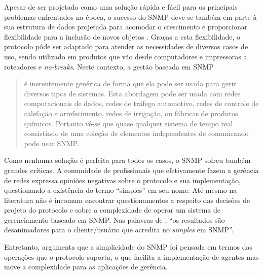 \documentclass[twoside,english,brazilian]{UNISINOSmonografia}
\begin{document}
Apesar de ser projetado como uma solução rápida e fácil para os principais 
problemas enfrentados na época, o sucesso do SNMP deve-se também em parte à 
sua estrutura de dados projetada para acomodar o crescimento e proporcionar 
flexibilidade para a inclusão de novos objetos \cite{stallings1999snmp}.
Graças a esta flexibilidade, o protocolo pôde ser adaptado para atender as 
necessidades de diversos casos de uso, sendo utilizado em produtos que vão 
desde computadores e impressoras a roteadores e \textit{no-breaks}.
Neste contexto, a gestão baseada em SNMP

\begin{quote}
é inerentemente genérica de forma que ela pode ser usada para gerir diversos 
tipos de sistemas. Esta abordagem pode ser usada com redes computacionais de 
dados, redes de tráfego automotivo, redes de controle de calefação e 
arrefecimento, redes de irrigação, ou fábricas de produtos químicos. Portanto 
vê-se que quase qualquer sistema de tempo real consistindo de uma coleção de 
elementos independentes de comunicando pode usar SNMP.
\cite[p.~2]{perkins1997understanding}
\end{quote}

Como nenhuma solução é perfeita para todos os casos, o SNMP sofreu também 
grandes críticas. 
A comunidade de profissionais que efetivamente fazem a gerência de redes 
expressa opiniões negativas sobre o protocolo e sua implementação, 
questionando a existência do termo ``simples'' em seu nome.
Até mesmo na literatura não é incomum encontrar questionamentos a respeito das 
decisões de projeto do protocolo e sobre a complexidade de operar um sistema 
de gerenciamento baseado em SNMP.
Nas palavras de , ``os resultados são 
desanimadores para o cliente/usuário que acredita no 
\textit{simples} em SNMP''.

Entretanto,  argumenta que a simplicidade do SNMP foi 
pensada em termos das operações que o protocolo suporta, o que facilita a 
implementação de agentes mas move a complexidade para as aplicações de 
gerência.
\end{document}
